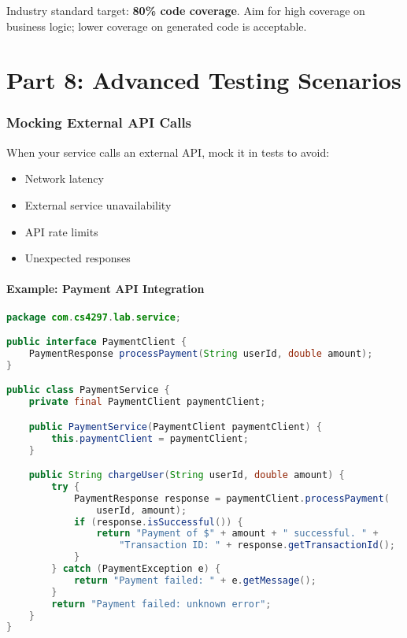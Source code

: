 \documentclass[12pt,a4paper]{article}
\begin{document}
\begin{importantbox}
Industry standard target: \textbf{80\% code coverage}. Aim for high coverage on business logic; lower coverage on generated code is acceptable.
\end{importantbox}

\newpage

\part{Part 8: Advanced Testing Scenarios}

\section{Mocking External API Calls}

When your service calls an external API, mock it in tests to avoid:
\begin{itemize}
    \item Network latency
    \item External service unavailability
    \item API rate limits
    \item Unexpected responses
\end{itemize}

\subsection{Example: Payment API Integration}

\begin{lstlisting}[language=java, caption=PaymentService with External API Call]
package com.cs4297.lab.service;

public interface PaymentClient {
    PaymentResponse processPayment(String userId, double amount);
}

public class PaymentService {
    private final PaymentClient paymentClient;

    public PaymentService(PaymentClient paymentClient) {
        this.paymentClient = paymentClient;
    }

    public String chargeUser(String userId, double amount) {
        try {
            PaymentResponse response = paymentClient.processPayment(
                userId, amount);
            if (response.isSuccessful()) {
                return "Payment of $" + amount + " successful. " +
                    "Transaction ID: " + response.getTransactionId();
            }
        } catch (PaymentException e) {
            return "Payment failed: " + e.getMessage();
        }
        return "Payment failed: unknown error";
    }
}
\end{lstlisting}
\end{document}
